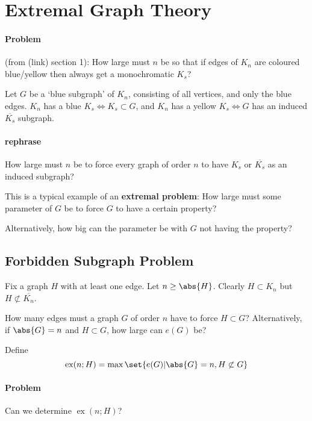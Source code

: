 \documentclass{article}
\DeclareMathOperator{\ext}{ex}
\begin{document}
\section{Extremal Graph Theory}

\paragraph{Problem} (from (link) section 1): How large must $n$ be so that if edges of $K_n$ are coloured blue/yellow then always get a monochromatic $K_s$?

Let $G$ be a `blue subgraph' of $K_n$, consisting of all vertices, and only the blue edges.
$K_n$ has a blue $K_s \iff K_s \subset G$, and $K_n$ has a yellow $K_s \iff G$ has an induced $\overline{K_s}$ subgraph.

\paragraph{rephrase}
How large must $n$ be to force every graph of order $n$ to have $K_s$ or $\overline{K_s}$ as an induced subgraph?

This is a typical example of an \textbf{extremal problem}: How large must some parameter of $G$ be to force $G$ to have a certain property?

Alternatively, how big can the parameter be with $G$ not having the property?

\subsection{Forbidden Subgraph Problem}
Fix a graph $H$ with at least one edge. Let $n \geq \abs{H}$. Clearly $H \subset K_n$ but $H \not\subset \overline{K_n}$.

How many edges must a graph $G$ of order $n$ have to force $H \subset G$? Alternatively, if $\abs{G} = n$ and $H \subset G$, how large can $e(G)$ be?

\begin{defi}
    Define
    \begin{equation*}
        \ext(n; H) = \max\set{e(G) | \abs{G} = n, H \not\subset G}
    \end{equation*}
\end{defi}

\paragraph{Problem} Can we determine $\ext(n; H)$?
\end{document}
